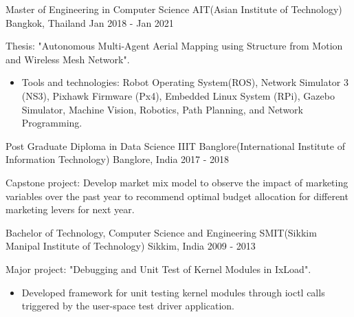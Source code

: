 

\begin{cventries}

  \cventry
    {Master of Engineering in Computer Science} %
    {AIT(Asian Institute of Technology)} %
    {Bangkok, Thailand} %
    {Jan 2018 - Jan 2021} %
    {
      \begin{cvitems} %
      \item {Thesis: "Autonomous Multi-Agent Aerial Mapping using Structure from Motion and Wireless Mesh Network".
        \begin{itemize}
            \item Tools and technologies: Robot Operating System(ROS), Network Simulator 3 (NS3), Pixhawk Firmware (Px4),  Embedded Linux System (RPi), Gazebo Simulator, Machine Vision, Robotics, Path Planning, and Network Programming.
        \end{itemize} }
      \end{cvitems}
    }

  \cventry
    {Post Graduate Diploma in Data Science} %
    {IIIT Banglore(International Institute of Information Technology)} %
    {Banglore, India} %
    {2017 - 2018} %
    {
      \begin{cvitems} %
      \item {Capstone project: Develop market mix model to observe the impact of marketing variables over the past year to recommend optimal budget allocation for different marketing levers for next year.}
      \end{cvitems}
    }

  \cventry
    {Bachelor of Technology, Computer Science and Engineering} %
    {SMIT(Sikkim Manipal Institute of Technology)} %
    {Sikkim, India} %
    {2009 - 2013} %
    {
      \begin{cvitems} %
      \item {Major project: "Debugging and Unit Test of Kernel Modules in IxLoad".
        \begin{itemize}
            \item Developed framework for unit testing kernel modules through ioctl calls triggered by the user-space test driver application.
        \end{itemize} }
      \end{cvitems}
    }
\end{cventries}
